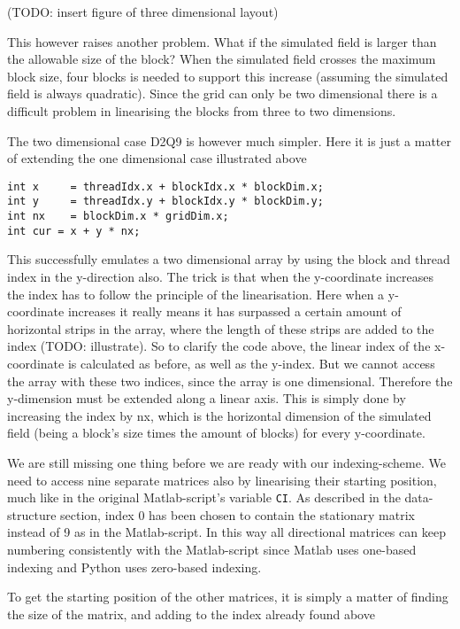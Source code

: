 (TODO: insert figure of three dimensional layout)

This however raises another problem. What if the simulated field is larger than the allowable size of the block? When the simulated field crosses the maximum block size, four blocks is needed to support this increase (assuming the simulated field is always quadratic). Since the grid can only be two dimensional there is a difficult problem in linearising the blocks from three to two dimensions.

The two dimensional case D2Q9 is however much simpler. Here it is just a matter of extending the one dimensional case illustrated above

\begin{verbatim}
int x     = threadIdx.x + blockIdx.x * blockDim.x;
int y     = threadIdx.y + blockIdx.y * blockDim.y;
int nx    = blockDim.x * gridDim.x;
int cur = x + y * nx;
\end{verbatim}

This successfully emulates a two dimensional array by using the block and thread index in the y-direction also. The trick is that when the y-coordinate increases the index has to follow the principle of the linearisation. Here when a y-coordinate increases it really means it has surpassed a certain amount of horizontal strips in the array, where the length of these strips are added to the index (TODO: illustrate). So to clarify the code above, the linear index of the x-coordinate is calculated as before, as well as the y-index. But we cannot access the array with these two indices, since the array is one dimensional. Therefore the y-dimension must be extended along a linear axis. This is simply done by increasing the index by nx, which is the horizontal dimension of the simulated field (being a block's size times the amount of blocks) for every y-coordinate.

We are still missing one thing before we are ready with our indexing-scheme. We need to access nine separate matrices also by linearising their starting position, much like in the original Matlab-script's variable \texttt{CI}. As described in the data-structure section, index 0 has been chosen to contain the stationary matrix instead of 9 as in the Matlab-script. In this way all directional matrices can keep numbering consistently with the Matlab-script since Matlab uses one-based indexing and Python uses zero-based indexing.

To get the starting position of the other matrices, it is simply a matter of finding the size of the matrix, and adding to the index already found above

